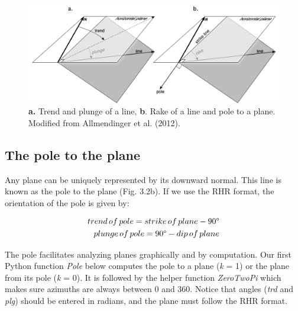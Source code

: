 \documentclass[a4paper , 12pt]{book}
\begin{document}
\begin{figure}[ht]
    \centering
    \includegraphics[width=13cm]{Figures/ch3f2.png}
    \caption{\textbf{a.} Trend and plunge of a line, \textbf{b}. Rake of a line and pole to a plane. Modified from Allmendinger et al. (2012).}
\end{figure}

\subsection{The pole to the plane}

Any plane can be uniquely represented by its downward normal. This line is known as the pole to the plane (Fig. 3.2b). If we use the RHR format, the orientation of the pole is given by:

\begin{equation}
    \begin{split}
        trend\,of\,pole = strike\,of\,plane -90\degree \\
        plunge\,of\,pole = 90\degree - dip\,of\,plane
    \end{split}
\end{equation}

The pole facilitates analyzing planes graphically and by computation. Our first Python function \textit{Pole} below computes the pole to a plane (\textit{k} = 1) or the plane from its pole (\textit{k} = 0). It is followed by the helper function \textit{ZeroTwoPi} which makes sure azimuths are always between 0 and 360\degree. Notice that angles (\textit{trd} and \textit{plg}) should be entered in radians, and the plane must follow the RHR format.
\end{document}
